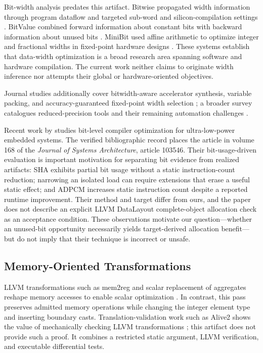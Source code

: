 \documentclass[11pt,twocolumn]{article}
\begin{document}
Bit-width analysis predates this artifact. Bitwise propagated width information
through program dataflow and targeted sub-word and silicon-compilation settings
\citep{stephenson2000bitwidth}. BitValue combined forward information about
constant bits with backward information about unused bits
\citep{budiu2000bitvalue}. MiniBit used affine arithmetic to optimize integer and
fractional widths in fixed-point hardware designs
\citep{lee2005minibit}. These systems establish that data-width optimization is
a broad research area spanning software and hardware compilation. The current
work neither claims to originate width inference nor attempts their global or
hardware-oriented objectives.

Journal studies additionally cover bitwidth-aware accelerator synthesis,
variable packing, and accuracy-guaranteed fixed-point width selection
\citep{mahlke2001bitwidth,nandivada2013packing,lee2006accuracy}; a broader survey
catalogues reduced-precision tools and their remaining automation challenges
\citep{cherubin2020survey}.

Recent work by \citet{heo2025bitlevel} studies bit-level compiler optimization
for ultra-low-power embedded systems. The verified bibliographic record places
the article in volume 168 of the \emph{Journal of Systems Architecture}, article
103546. Their bit-usage-driven evaluation is important motivation for separating
bit evidence from realized artifacts: SHA exhibits partial bit usage without a
static instruction-count reduction; narrowing an isolated load can require
extensions that erase a useful static effect; and ADPCM increases static
instruction count despite a reported runtime improvement. Their method and
target differ from ours, and the paper does not describe an explicit LLVM
DataLayout complete-object allocation check as an acceptance condition. These
observations motivate our question---whether an unused-bit opportunity
necessarily yields target-derived allocation benefit---but do not imply that
their technique is incorrect or unsafe.

\subsection{Memory-Oriented Transformations}

LLVM transformations such as mem2reg and scalar replacement of aggregates
reshape memory accesses to enable scalar optimization \citep{llvmSROA}. In
contrast, this pass preserves admitted memory operations while changing the
integer element type and inserting boundary casts. Translation-validation work
such as Alive2 shows the value of mechanically checking LLVM transformations
\citep{lopes2021alive2}; this artifact does not provide such a proof. It combines
a restricted static argument, LLVM verification, and executable differential
tests.
\end{document}
